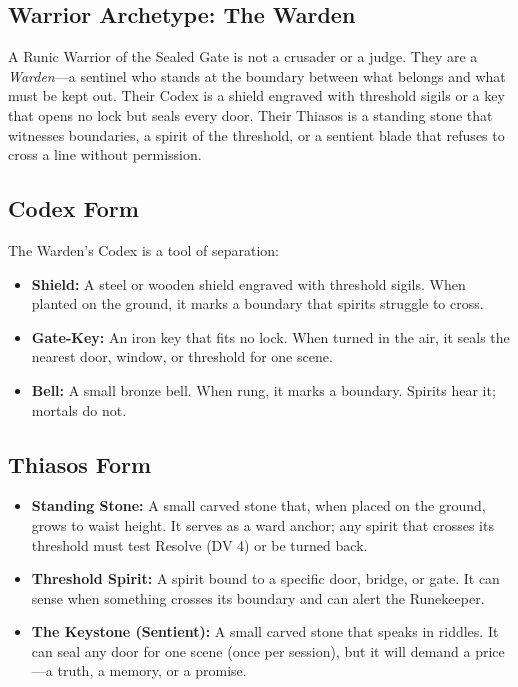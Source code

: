 \subsection{Warrior Archetype: The Warden}

A Runic Warrior of the Sealed Gate is not a crusader or a judge. They are a \textit{Warden}—a sentinel who stands at the boundary between what belongs and what must be kept out. Their Codex is a shield engraved with threshold sigils or a key that opens no lock but seals every door. Their Thiasos is a standing stone that witnesses boundaries, a spirit of the threshold, or a sentient blade that refuses to cross a line without permission.

\subsection{Codex Form}

The Warden's Codex is a tool of separation:

\begin{itemize}
\item \textbf{Shield:} A steel or wooden shield engraved with threshold sigils. When planted on the ground, it marks a boundary that spirits struggle to cross.
\item \textbf{Gate-Key:} An iron key that fits no lock. When turned in the air, it seals the nearest door, window, or threshold for one scene.
\item \textbf{Bell:} A small bronze bell. When rung, it marks a boundary. Spirits hear it; mortals do not.
\end{itemize}

\subsection{Thiasos Form}

\begin{itemize}
\item \textbf{Standing Stone:} A small carved stone that, when placed on the ground, grows to waist height. It serves as a ward anchor; any spirit that crosses its threshold must test Resolve (DV 4) or be turned back.
\item \textbf{Threshold Spirit:} A spirit bound to a specific door, bridge, or gate. It can sense when something crosses its boundary and can alert the Runekeeper.
\item \textbf{The Keystone (Sentient):} A small carved stone that speaks in riddles. It can seal any door for one scene (once per session), but it will demand a price—a truth, a memory, or a promise.
\end{itemize}

